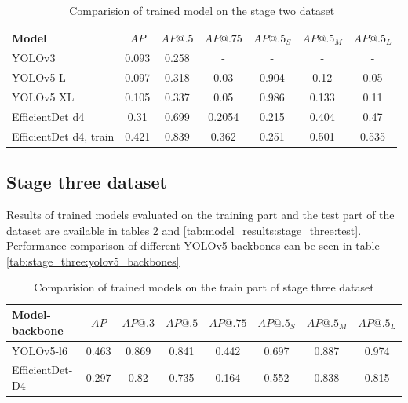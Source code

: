 \begin{table}[h]
    \centering
    \begin{tabular}{|l|c|c|c|c|c|c|}
        \hline
        Model                  & $AP$  & $AP@.5$ & $AP@.75$ & $AP@.5_S$ & $AP@.5_M$ & $AP@.5_L$ \\ \hline
        YOLOv3                 & 0.093 & 0.258   & -        & -         & -         & -         \\ \hline
        YOLOv5 L               & 0.097 & 0.318   & 0.03     & 0.904     & 0.12      & 0.05      \\ \hline
        YOLOv5 XL              & 0.105 & 0.337   & 0.05     & 0.986     & 0.133     & 0.11      \\ \hline
        EfficientDet d4        & 0.31  & 0.699   & 0.2054   & 0.215     & 0.404     & 0.47      \\ \hline
        EfficientDet d4, train & 0.421 & 0.839   & 0.362    & 0.251     & 0.501     & 0.535     \\ \hline
    \end{tabular}
    \caption{Comparision of trained model on the stage two dataset}
    \label{tab:model_results:stage_two}
\end{table}

\subsection{Stage three dataset}
Results of trained models evaluated on the training part and the test part of the dataset are available in tables \ref{tab:model_results:stage_three:train} and \ref{tab:model_results:stage_three:test}. Performance comparison of different YOLOv5 backbones can be seen in table \ref{tab:stage_three:yolov5_backbones}

\begin{table}[H]
    \centering
    \begin{tabular}{|l|c|c|c|c|c|c|c|}
        \hline
        Model-backbone  & $AP$  & $AP@.3$ & $AP@.5$ & $AP@.75$ & $AP@.5_S$ & $AP@.5_M$ & $AP@.5_L$ \\ \hline
        YOLOv5-l6       & 0.463 & 0.869   & 0.841   & 0.442    & 0.697     & 0.887     & 0.974     \\ \hline
        EfficientDet-D4 & 0.297 & 0.82    & 0.735   & 0.164    & 0.552     & 0.838     & 0.815     \\ \hline
    \end{tabular}
    \caption{Comparision of trained models on the train part of stage three dataset}
    \label{tab:model_results:stage_three:train}
\end{table}

